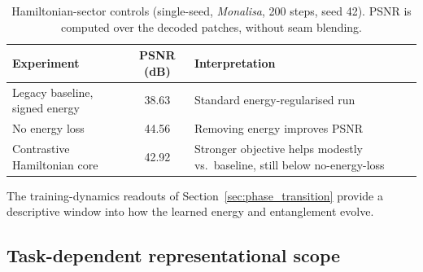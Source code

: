 \documentclass[pdflatex,sn-basic]{sn-jnl}
\begin{document}
\begin{table}[t]
  \centering
  \caption{Hamiltonian-sector controls (single-seed, \textit{Monalisa}, 200 steps, seed 42).
  PSNR is computed over the decoded patches, without seam blending.}
  \label{tab:hamiltonian_controls}
  \begin{tabularx}{\textwidth}{@{}L{0.30\textwidth} c Y@{}}
    \toprule
    Experiment                      & PSNR (dB) & Interpretation \\
    \midrule
    Legacy baseline, signed energy  & 38.63     & Standard energy-regularised run \\
    No energy loss                  & 44.56     & Removing energy improves PSNR \\
    Contrastive Hamiltonian core    & 42.92     & Stronger objective helps modestly
                                                  vs.\ baseline, still below
                                                  no-energy-loss \\
    \bottomrule
  \end{tabularx}
\end{table}

The training-dynamics readouts of Section~\ref{sec:phase_transition} provide a descriptive window into how the learned energy and entanglement evolve.

\subsection{Task-dependent representational scope}
\label{sec:dequant}
\label{sec:representativeness}
\end{document}
